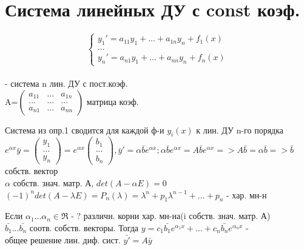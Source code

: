 \section{Система линейных ДУ с const коэф.}

\begin{Def}
    \[\begin{cases}
    y_1'=a_{11}y_1+...+a_{1n}y_n+f_1(x)\\
    ...\\
    y_n'=a_{n1}y_1+...+a_{nn}y_n+f_n(x)
    \end{cases}\]
\\
- система n лин. ДУ с пост.коэф.\\
A=$\begin{pmatrix} a_{11}& ...& a_{1n}\\  ...& ...& ...\\ a_{n1}& ...& a_{nn}\end{pmatrix}$ матрица коэф.\\
\end{Def}

\begin{Note}
    Система из опр.1 сводится для каждой ф-и $y_i(x)$ к лин. ДУ n-го порядка\\
    $e^{\alpha x} \bar{y}=\begin{pmatrix} y_{1}\\  ...\\ y_{n}\end{pmatrix}=e^{\alpha x}\begin{pmatrix} b_{1}\\  ...\\ b_{n}\end{pmatrix} ,\bar{y}'=\alpha \bar{b}e^{\alpha x}; \alpha \bar{b} e^{\alpha x}=A\bar{b} e^{\alpha x}=>A\bar{b}=\alpha \bar{b}=>\bar{b}$ собств. вектор\\
    $\alpha$ собств. знач. матр. А, $det(A-\alpha E)=0$\\
    $(-1)^n det(A-\lambda E)=P_n(\lambda)=\lambda^n+p_1 \lambda^{n-1}+...+p_n$ - хар. мн-н\\
\end{Note}

\begin{Note}
    Если $\alpha_1...\alpha_n \in \Re$ - ? различн. корни хар. мн-на(i собств. знач. матр. А) \\
    $\bar{b_1}...\bar{b_n}$ соотв. собств. векторы. Тогда $y=c_1\bar{b_1}e^{\alpha_1 x}+...+c_n\bar{b_n}e^{\alpha_n x}$ -\\
    общее решение лин. диф. сист. $\bar{y'}=A\bar{y}$\\
\end{Note}

